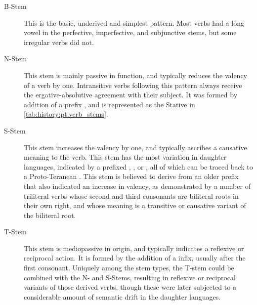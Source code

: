 \documentclass[grammar]{subfiles}
\begin{document}
\begin{description}
  \item[B-Stem] This is the basic, underived and simplest pattern.  Most verbs
    had a long vowel in the perfective, imperfective, and subjunctive stems,
    but some irregular verbs did not.
  \item[N-Stem] This stem is mainly passive in function, and typically reduces
    the valency of a verb by one.  Intransitive verbs following this pattern
    always receive the ergative-absolutive agreement with their subject.  It
    was formed by addition of a prefix , and is represented as the
    Stative in \cref{tab:history:pt:verb_stems}.
  \item[S-Stem] This stem increases the valency by one, and typically ascribes
    a causative meaning to the verb.  This stem has the most variation in
    daughter languages, indicated by a prefixed , ,
     or , all of which can be traced back to a
    Proto-Teranean .  This stem is believed to derive from an older
    prefix that also indicated an increase in valency, as demonstrated by a
    number of triliteral verbs whose second and third consonants are biliteral
    roots in their own right, and whose meaning is a transitive or causative
    variant of the biliteral root.
  \item[T-Stem] This stem is mediopassive in origin, and typically indicates a
    reflexive or reciprocal action.  It is formed by the addition of a
     infix, usually after the first consonant.  Uniquely among the
    stem types, the T-stem could be combined with the N- and S-Stems, resulting
    in reflexive or reciprocal variants of those derived verbs, though these
    were later subjected to a considerable amount of semantic drift in the
    daughter languages.
\end{description}
\end{document}
